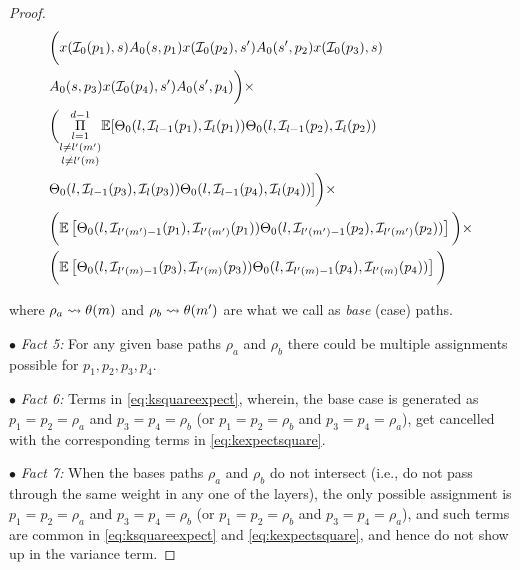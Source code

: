 \begin{appendix}
\begin{proof}
\begin{align*}
&\bigg(x(\mathcal{I}_0(p_1),s)A_0(s,p_1)x(\mathcal{I}_0(p_2),s')A_0(s',p_2)x(\mathcal{I}_0(p_3),s)\\
&A_0(s,p_3)x(\mathcal{I}_0(p_4),s')A_0(s',p_4)\bigg)\times\\
&\bigg( \underset{l\neq l'(m)} {\underset{l\neq l'(m')}{\underset{l=1}{\overset{d-1}{\Pi}}}} \mathbb{E}[{\Theta}_0(l,\mathcal{I}_{l-1}(p_1),\mathcal{I}_{l}(p_1)) {\Theta}_0(l,\mathcal{I}_{l-1}(p_2),\mathcal{I}_{l}(p_2))\nonumber\\
&{\Theta}_0(l,\mathcal{I}_{l-1}(p_3),\mathcal{I}_{l}(p_3)) {\Theta}_0(l,\mathcal{I}_{l-1}(p_4),\mathcal{I}_{l}(p_4))] \bigg)\times\nonumber\\
&\bigg( \mathbb{E}\left[{\Theta}_0(l,\mathcal{I}_{l'(m')-1}(p_1),\mathcal{I}_{l'(m')}(p_1)) {\Theta}_0(l,\mathcal{I}_{l'(m')-1}(p_2),\mathcal{I}_{l'(m')}(p_2))\right]\bigg)\times\nonumber\\
&\bigg(\mathbb{E}\left[{\Theta}_0(l,\mathcal{I}_{l'(m)-1}(p_3),\mathcal{I}_{l'(m)}(p_3)) {\Theta}_0(l,\mathcal{I}_{l'(m)-1}(p_4),\mathcal{I}_{l'(m)}(p_4))\right] \bigg)\nonumber\\
\end{align*}

where $\rho_a\rightsquigarrow \theta(m)$ and $\rho_b\rightsquigarrow \theta(m')$ are what we call as \emph{base} (case) paths. 


$\bullet$ \emph{Fact 5:} For any given base paths $\rho_a$ and $\rho_b$ there could be multiple assignments possible for $p_1,p_2,p_3,p_4$.

$\bullet$ \emph{Fact 6:}  Terms in \eqref{eq:ksquareexpect}, wherein, the base case is generated as $p_1=p_2=\rho_a$ and $p_3=p_4=\rho_b$ (or $p_1=p_2=\rho_b$ and $p_3=p_4=\rho_a$), get cancelled with the corresponding terms in \eqref{eq:kexpectsquare}.

$\bullet$ \emph{Fact 7:}  When the bases paths $\rho_a$ and $\rho_b$ do not intersect (i.e., do not pass through the same weight in any one of the layers), the only possible assignment is $p_1=p_2=\rho_a$ and $p_3=p_4=\rho_b$ (or $p_1=p_2=\rho_b$ and $p_3=p_4=\rho_a$), and such terms are common in \eqref{eq:ksquareexpect} and \eqref{eq:kexpectsquare}, and hence do not show up in the variance term.



\end{proof}
\end{appendix}
